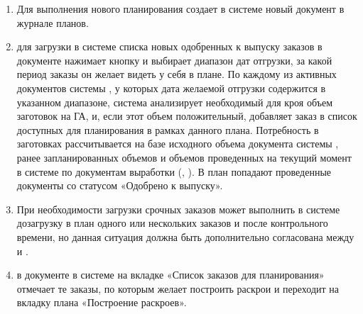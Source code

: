 \begin{enumerate}


\item Для выполнения нового планирования \planner создает в системе \gofro новый документ  в журнале планов. 
\item	\planner  для загрузки в системе \gofro списка новых одобренных \manager к выпуску заказов  в документе  нажимает кнопку  и выбирает диапазон дат отгрузки, за какой период заказы он желает видеть у себя в плане. По каждому из активных документов  системы \gofro, у которых дата желаемой отгрузки содержится в указанном диапазоне, система \gofro анализирует необходимый для кроя объем заготовок на ГА, и, если этот объем положительный, добавляет заказ в список доступных для планирования в рамках данного плана. Потребность в заготовках рассчитывается на базе исходного объема документа  системы \gofro, ранее запланированных объемов и объемов проведенных на текущий момент в системе \gofro по документам выработки (, ). В план попадают проведенные документы  со статусом «Одобрено к выпуску».
\item	При необходимости загрузки срочных заказов \planner может выполнить в системе \gofro дозагрузку в план одного или нескольких заказов и после контрольного времени, но данная ситуация должна быть дополнительно согласована между \manager  и \planner.
\item \planner в документе  в системе \gofro на вкладке «Список заказов для планирования»  отмечает те заказы, по которым желает построить раскрои и переходит на вкладку плана «Построение раскроев».

\end{enumerate}
